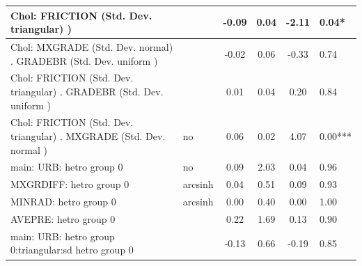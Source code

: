 \begin{table}
\begin{center}
\begin{tabular}{|l|l|c|c|c|l|}
			\hline
			 Chol: FRICTION (Std. Dev. triangular) ) &  & -0.09 & 0.04 & -2.11 & 0.04* \\
			\hline
			 Chol: MXGRADE (Std. Dev. normal) . GRADEBR (Std. Dev.   uniform ) &  & -0.02 & 0.06 & -0.33 & 0.74 \\
			\hline
			 Chol: FRICTION (Std. Dev. triangular) . GRADEBR (Std. Dev.   uniform ) &  & 0.01 & 0.04 & 0.20 & 0.84 \\
			\hline
			 Chol: FRICTION (Std. Dev. triangular) . MXGRADE (Std. Dev.   normal ) & no & 0.06 & 0.02 & 4.07 & 0.00*** \\
			\hline
			main: URB: hetro group 0 & no & 0.09 & 2.03 & 0.04 & 0.96 \\
			\hline
			MXGRDIFF: hetro group 0 & arcsinh & 0.04 & 0.51 & 0.09 & 0.93 \\
			\hline
			MINRAD: hetro group 0 & arcsinh & 0.00 & 0.40 & 0.00 & 1.00 \\
			\hline
			AVEPRE: hetro group 0 &  & 0.22 & 1.69 & 0.13 & 0.90 \\
			\hline
			main: URB: hetro group 0:triangular:sd  hetro group 0 &  & -0.13 & 0.66 & -0.19 & 0.85 \\
			\hline
		\end{tabular}
	\end{center}
\end{table}